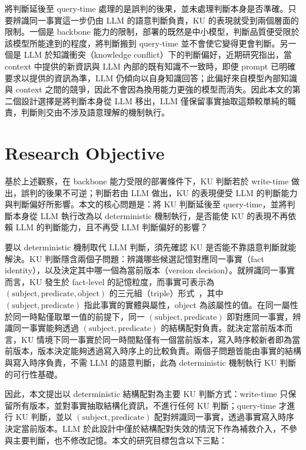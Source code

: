將判斷延後至 query-time 處理的是誤判的後果，並未處理判斷本身是否準確。只要辨識同一事實這一步仍由 LLM 的語意判斷負責，KU 的表現就受到兩個層面的限制。一個是 backbone 能力的限制，部署的既然是中小模型，判斷品質便受限於該模型所能達到的程度，將判斷搬到 query-time 並不會使它變得更會判斷。另一個是 LLM 於知識衝突（knowledge conflict）下的判斷偏好，近期研究指出，當 context 中提供的新資訊與 LLM 內部的既有知識不一致時，即便 prompt 已明確要求以提供的資訊為準，LLM 仍傾向以自身知識回答\cite{longpre2021entity}\hspace{-0.05em}\cite{xu2024knowledge}；此偏好來自模型內部知識與 context 之間的競爭，因此不會因為換用能力更強的模型而消失。因此本文的第二個設計選擇是將判斷本身從 LLM 移出，LLM 僅保留事實抽取這類較單純的職責，判斷則交由不涉及語意理解的機制執行。

\section{Research Objective}

基於上述觀察，在 backbone 能力受限的部署條件下，KU 判斷若於 write-time 做出，誤判的後果不可逆；判斷若由 LLM 做出，KU 的表現便受 LLM 的判斷能力與判斷偏好所影響。本文的核心問題是：將 KU 判斷延後至 query-time，並將判斷本身從 LLM 執行改為以 deterministic 機制執行，是否能使 KU 的表現不再依賴 LLM 的判斷能力，且不再受 LLM 判斷偏好的影響？

要以 deterministic 機制取代 LLM 判斷，須先確認 KU 是否能不靠語意判斷就能解決。KU 判斷隱含兩個子問題：辨識哪些候選記憶對應同一事實（fact identity），以及決定其中哪一個為當前版本（version decision）。就辨識同一事實而言，KU 發生於 fact-level 的記憶粒度，而事實可表示為 $(\text{subject}, \text{predicate}, \text{object})$ 的三元組（triple）形式~\cite{zhong2023comprehensive}，其中 $(\text{subject}, \text{predicate})$ 指此事實的實體與屬性，object 為該屬性的值。在同一屬性於同一時點僅取單一值的前提下，同一 $(\text{subject}, \text{predicate})$ 即對應同一事實，辨識同一事實能夠透過 $(\text{subject}, \text{predicate})$ 的結構配對負責。就決定當前版本而言，KU 情境下同一事實於同一時間點僅有一個當前版本，寫入時序較新者即為當前版本，版本決定能夠透過寫入時序上的比較負責。兩個子問題皆能由事實的結構與寫入時序負責，不需 LLM 的語意判斷，此為 deterministic 機制執行 KU 判斷的可行性基礎。

因此，本文提出以 deterministic 結構配對為主要 KU 判斷方式：write-time 只保留所有版本，並對事實抽取結構化資訊，不進行任何 KU 判斷；query-time 才進行 KU 判斷，並以 $(\text{subject}, \text{predicate})$ 配對辨識同一事實，透過事實寫入時序決定當前版本。LLM 於此設計中僅於結構配對失效的情況下作為補救介入，不參與主要判斷，也不修改記憶。本文的研究目標包含以下三點：

